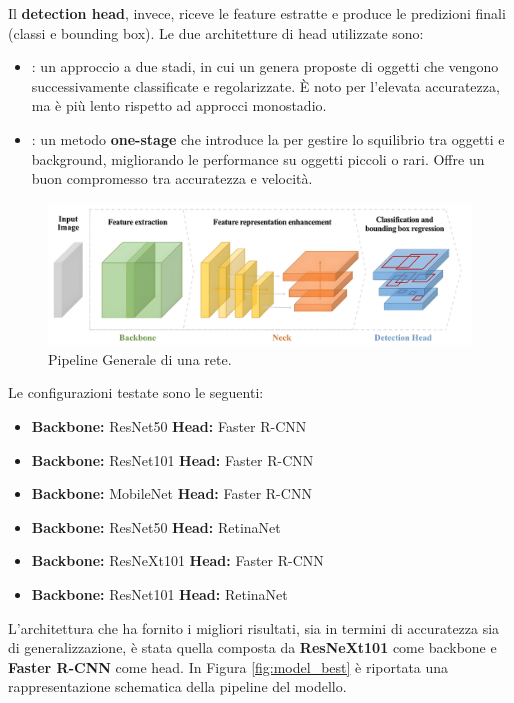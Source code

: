 \documentclass[minted, draw]{../tex/hebdomon}
\begin{document}
Il \textbf{detection head}, invece, riceve le feature estratte e produce le predizioni finali (classi e bounding box). Le due architetture di head utilizzate sono:

\begin{itemize}
	\item {}: un approccio a due stadi, in cui un  genera proposte di oggetti che vengono successivamente classificate e regolarizzate. È noto per l’elevata accuratezza, ma è più lento rispetto ad approcci monostadio.
	\item {}: un metodo \textbf{one-stage} che introduce la  per gestire lo squilibrio tra oggetti e background, migliorando le performance su oggetti piccoli o rari. Offre un buon compromesso tra accuratezza e velocità.
\end{itemize}

%
\begin{figure}[H]
  \centering
  \includegraphics[width=\linewidth]{figures/general_pipeline.png}
  \caption{Pipeline Generale di una rete.}
  \label{fig:general_pipeline}
\end{figure}
%

Le configurazioni testate sono le seguenti:
\begin{itemize}
    \item \textbf{Backbone:} ResNet50 \quad \textbf{Head:} Faster R-CNN
    \item \textbf{Backbone:} ResNet101 \quad \textbf{Head:} Faster R-CNN
    \item \textbf{Backbone:} MobileNet \quad \textbf{Head:} Faster R-CNN
    \item \textbf{Backbone:} ResNet50 \quad \textbf{Head:} RetinaNet
    \item \textbf{Backbone:} ResNeXt101 \quad \textbf{Head:} Faster R-CNN
    \item \textbf{Backbone:} ResNet101 \quad \textbf{Head:} RetinaNet
\end{itemize}

L’architettura che ha fornito i migliori risultati, sia in termini di accuratezza sia di generalizzazione, è stata quella composta da \textbf{ResNeXt101} come backbone e \textbf{Faster R-CNN} come head. In Figura \ref{fig:model_best} è riportata una rappresentazione schematica della pipeline del modello.
\end{document}
